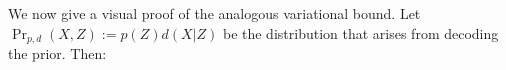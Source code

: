 \documentclass[twoside]{article}
\makeatletter
\theoremstyle{plain}
\theoremstyle{definition}
\newcommand\aar{\@ifstar\aar@one@star\aar@plain}
\newcommand\aar@one@star{\@ifstar\aar@resize{\aar@plain*}}
\newcommand\aar@resize[1]{\sbox{\aar@content}{#1}\scaleleftright[3.8ex]
		{\Biggl\langle\!\!\!\!\Biggl\langle}{\usebox{\aar@content}}
		{\Biggr\rangle\!\!\!\!\Biggr\rangle}}
\makeatother
\begin{document}
%
We now give a visual proof of the analogous variational bound.
Let $\Pr_{p,d}(X,Z) := p(Z)d(X|Z)$ be
the distribution that arises from decoding the prior. Then:
\end{document}
